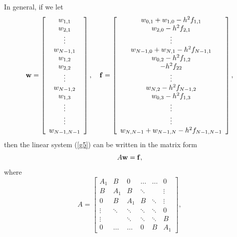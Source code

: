 \vskip 0.5cm
 
In general, if we let
\begin{equation}
{\bf w}=\left[
\begin{array}{c}
w_{1,1} \\
w_{2,1} \\
\vdots \\
w_{N-1,1} \\
w_{1,2} \\
w_{2,2} \\
\vdots \\
w_{N-1,2} \\
w_{1,3} \\
\vdots \\
\vdots \\
w_{N-1,N-1}
\end{array}\right],
\quad {\bf f}=\left[
\begin{array}{c}
w_{0,1}+w_{1,0}-h^{2}f_{1,1} \\
w_{2,0}-h^{2}f_{2,1} \\
\vdots \\
w_{N-1,0}+w_{N,1}-h^{2}f_{N-1,1} \\
w_{0,2}-h^{2}f_{1,2} \\
-h^{2}f_{22}\\
\vdots \\
w_{N,2}-h^{2}f_{N-1,2} \\
w_{0,3}-h^{2}f_{1,3} \\
\vdots \\
\vdots \\
w_{N,N-1}+w_{N-1,N}-h^{2}f_{N-1,N-1}
\end{array}\right],
\label{g8}
\end{equation}
then the linear system (\ref{g5}) can be written in the matrix form
\begin{equation}
A{\bf w}={\bf f}, \label{g9}
\end{equation}
where
\begin{equation}
A=\left[
\begin{array}{cccccc}
A_{1} &B &0      &\dots  &\dots &0 \\
B &A_{1} &B &\ddots  &     &\vdots \\
0      &B &A_{1} &B &\ddots &\vdots \\
\vdots &\ddots &\ddots &\ddots &\ddots &0 \\
\vdots &       &\ddots &\ddots &\ddots &B \\
0      &\dots  &\dots  &0      &B &A_{1}
\end{array}\right], \label{g10}
\end{equation}

